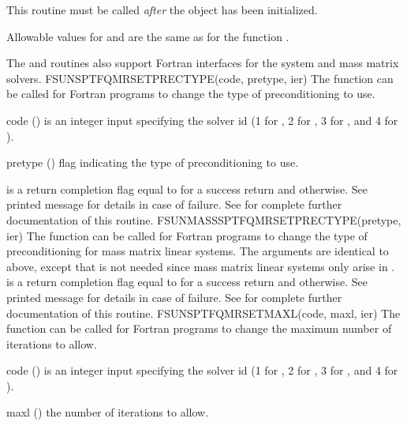 {
  This routine must be called \emph{after} the {\nvector} object has
  been initialized.

  Allowable values for  and  are the same as for
  the {\CC} function \newline {}.
}
%
%
The  and
 routines also support Fortran
interfaces for the system and mass matrix solvers.
%
%
{
  FSUNSPTFQMRSETPRECTYPE(code, pretype, ier)
}
{
  The function  can be called for Fortran
  programs to change the type of preconditioning to use.
}
{
  \begin{args}[pretype]
  \item[code] ()
    is an integer input specifying the solver id (1 for {\cvode}, 2
    for {\ida}, 3 for {\kinsol}, and 4 for {\arkode}).
  \item[pretype] ()
    flag indicating the type of preconditioning to use.
  \end{args}
}
{
   is a  return completion flag equal to  for a success
  return and  otherwise. See printed message for details in case
  of failure.
}
{
  See  for complete further documentation of
  this routine.
}
%
%
{
  FSUNMASSSPTFQMRSETPRECTYPE(pretype, ier)
}
{
  The function  can be called for Fortran
  programs to change the type of preconditioning for mass matrix
  linear systems.
}
{
  The arguments are identical to  above,
  except that  is not needed since mass matrix linear systems
  only arise in {\arkode}.
}
{
   is a  return completion flag equal to  for a success
  return and  otherwise. See printed message for details in case
  of failure.
}
{
  See  for complete further documentation of
  this routine.
}
%
%
{
  FSUNSPTFQMRSETMAXL(code, maxl, ier)
}
{
  The function  can be called for Fortran
  programs to change the maximum number of iterations to allow.
}
{
  \begin{args}[maxl]
  \item[code] ()
    is an integer input specifying the solver id (1 for {\cvode}, 2
    for {\ida}, 3 for {\kinsol}, and 4 for {\arkode}).
  \item[maxl] ()
    the number of iterations to allow.
  \end{args}
}
